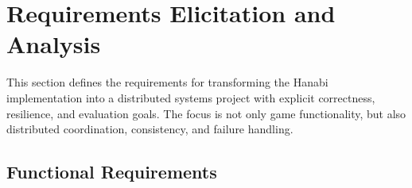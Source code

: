 \documentclass{scrartcl}
\begin{document}
\section{Requirements Elicitation and Analysis}\label{requirements}

This section defines the requirements for transforming the Hanabi implementation into a distributed systems project with explicit correctness, resilience, and evaluation goals.
The focus is not only game functionality, but also distributed coordination, consistency, and failure handling.

\subsection{Functional Requirements}
\label{functional-requirements}
\end{document}
